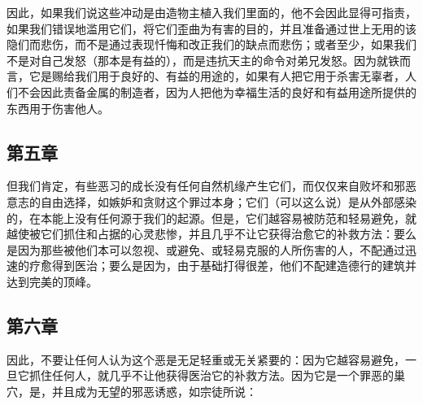 \par

因此，如果我们说这些冲动是由造物主植入我们里面的，他不会因此显得可指责，如果我们错误地滥用它们，将它们歪曲为有害的目的，并且准备通过世上无用的该隐们而悲伤，而不是通过表现忏悔和改正我们的缺点而悲伤；或者至少，如果我们不是对自己发怒（那本是有益的），而是违抗天主的命令对弟兄发怒。因为就铁而言，它是赐给我们用于良好的、有益的用途的，如果有人把它用于杀害无辜者，人们不会因此责备金属的制造者，因为人把他为幸福生活的良好和有益用途所提供的东西用于伤害他人。\par


\subsection{第五章}

\par

但我们肯定，有些恶习的成长没有任何自然机缘产生它们，而仅仅来自败坏和邪恶意志的自由选择，如嫉妒和贪财这个罪过本身；它们（可以这么说）是从外部感染的，在本能上没有任何源于我们的起源。但是，它们越容易被防范和轻易避免，就越使被它们抓住和占据的心灵悲惨，并且几乎不让它获得治愈它的补救方法：要么是因为那些被他们本可以忽视、或避免、或轻易克服的人所伤害的人，不配通过迅速的疗愈得到医治；要么是因为，由于基础打得很差，他们不配建造德行的建筑并达到完美的顶峰。\par


\subsection{第六章}

\par

因此，不要让任何人认为这个恶是无足轻重或无关紧要的：因为它越容易避免，一旦它抓住任何人，就几乎不让他获得医治它的补救方法。因为它是一个罪恶的巢穴，是，并且成为无望的邪恶诱惑，如宗徒所说：\par



